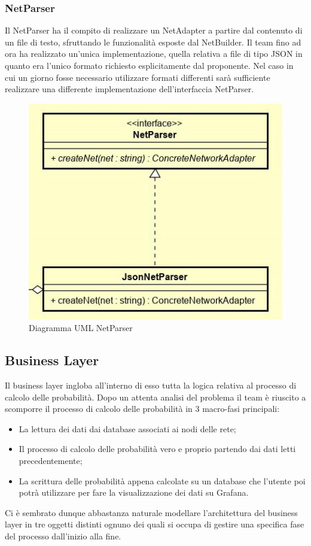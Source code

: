 \subsubsection{NetParser}
Il NetParser ha il compito di realizzare un NetAdapter a partire dal contenuto di un file di testo, sfruttando le funzionalità esposte dal NetBuilder.
Il team fino ad ora ha realizzato un'unica implementazione, quella relativa a file di tipo JSON in quanto era l'unico formato richiesto esplicitamente dal proponente.
Nel caso in cui un giorno fosse necessario utilizzare formati differenti sarà sufficiente realizzare una differente implementazione dell'interfaccia NetParser.
\begin{figure} [H]
	\centering
	\includegraphics[scale=1]{Img/NetParser}
	\caption{Diagramma UML NetParser}\label{}
\end{figure}
\subsection{Business Layer}
Il business layer ingloba all'interno di esso tutta la logica relativa al processo di calcolo delle probabilità.
Dopo un attenta analisi del problema il team è riuscito a scomporre il processo di calcolo delle probabilità in 3 macro-fasi principali:
\begin{itemize}
	\item La lettura dei dati dai database associati ai nodi delle rete;
	\item Il processo di calcolo delle probabilità vero e proprio partendo dai dati letti precedentemente;
	\item La scrittura delle probabilità appena calcolate su un database che l'utente poi potrà utilizzare per fare la visualizzazione dei dati su Grafana.
\end{itemize}
Ci è sembrato dunque abbastanza naturale modellare l'architettura del business layer in tre oggetti distinti ognuno dei quali si occupa di gestire una specifica fase del processo dall'inizio alla fine.
 
